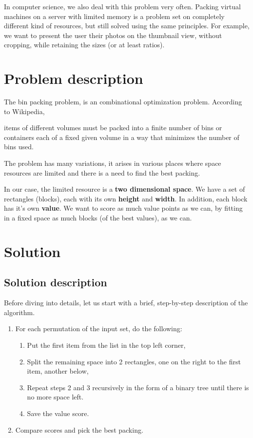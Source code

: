 In computer science, we also deal with this problem very often.
Packing virtual machines on a server with limited memory is a problem set
on completely different kind of resources,
but still solved using the same principles.
For example, we want to present the user their photos on the thumbnail view,
without cropping, while retaining the sizes (or at least ratios).

\section{Problem description}
The bin packing problem,
is an combinational optimization problem. %
According to Wikipedia\cite{wikibinpacking},
\begin{displayquote}
\textelp{} items of different volumes must be packed into a finite number of
bins or containers each of a fixed given volume in a way that minimizes the
number of bins used.
\end{displayquote}
The problem has many variations,
it arises in various places where space resources are limited and there is a
need to find the best packing.

In our case, the limited resource is a \textbf{two dimensional space}.
We have a set of rectangles (blocks),
each with its own \textbf{height} and \textbf{width}.
In addition, each block has it's own \textbf{value}.
We want to score as much value points as we can,
by fitting in a fixed space as much blocks (of the best values),
as we can.

\section{Solution}
\subsection{Solution description}
Before diving into details, let us start with a brief,
step-by-step description of the algorithm.

\begin{enumerate}
  \item For each permutation of the input set, do the following:
  \begin{enumerate}
    \item Put the first item from the list in the top left corner,
    \item Split the remaining space into 2 rectangles, one on the right
      to the first item, another below,
    \item Repeat steps 2 and 3 recursively in the form of a binary tree
      until there is no more space left.
    \item Save the value score.
  \end{enumerate}
  \item Compare scores and pick the best packing. 
\end{enumerate}

